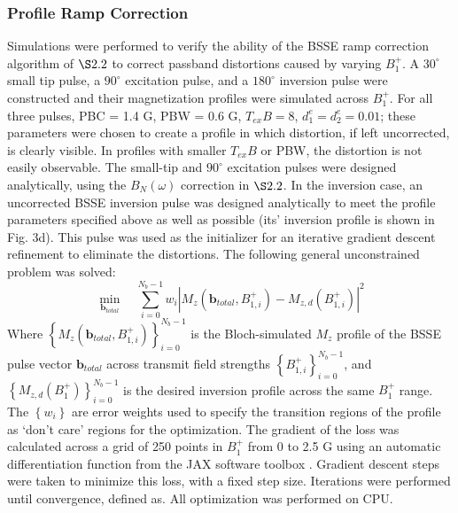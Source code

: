 \documentclass{article}
\renewcommand{\textcolor}[1]{}
\begin{document}
\subsubsection{Profile Ramp Correction}
Simulations were performed to verify the ability of the BSSE ramp correction algorithm of $\S 2.2$ to correct passband distortions caused by varying $B_1^+$.
A $30^\circ$ small tip pulse, a $90^\circ$ excitation pulse, and a $180^\circ$ inversion pulse were constructed and their magnetization profiles were simulated across $B_1^+$.
For all three pulses, PBC = 1.4 G, PBW = 0.6 G, $T_{ex}B = 8$, $d_1^e=d_2^e=0.01$; 
these parameters were chosen to create a profile in which distortion, if left uncorrected, is clearly visible.
In profiles with smaller $T_{ex}B$ or PBW, the distortion is not easily observable. 
The small-tip and $90^\circ$ excitation pulses were designed analytically, 
using the $B_N(\omega)$ correction in $\S 2.2$.
In the inversion case, 
an uncorrected BSSE inversion pulse was designed analytically to meet the profile parameters specified above as well as possible (its' inversion profile is shown in Fig. 3d). 
This pulse was used as the initializer for an iterative gradient descent refinement to eliminate the distortions. 
The following general unconstrained problem was solved:
\begin{equation}
\min_{\bm{b}_{total}} \quad \sum_{i = 0}^{N_b - 1} w_i \left\vert M_z\left(\bm{b}_{total}, B_{1,i}^+\right) - M_{z,d}\left(B_{1,i}^+\right) \right\vert^2
\end{equation}
Where $\left\{M_z(\bm{b}_{total}, B_{1,i}^+)\right\}_{i = 0}^{N_b - 1}$ 
is the Bloch-simulated $M_z$ profile of the BSSE pulse vector $\bm{b}_{total}$ 
across transmit field strengths $\left\{B_{1,i}^+\right\}_{i=0}^{N_b-1}$, 
and $\left\{M_{z,d}(B_1^+)\right\}_{i=0}^{N_b-1}$ is the desired inversion profile across the same $B_1^+$ range. 
The $\left\{w_i\right\}$ are error weights used to specify the transition regions of the profile as `don't care' regions for the optimization.
The gradient of the loss was calculated across a grid of 250 points in $B_1^+$ from 0 to 2.5 G using an automatic differentiation function from the JAX software toolbox \cite{Bradbury2018JAX:Programs}. Gradient descent steps were taken to minimize this loss, with a fixed step size. 
Iterations were performed until convergence, defined as. 
All optimization was performed on CPU.
\end{document}

